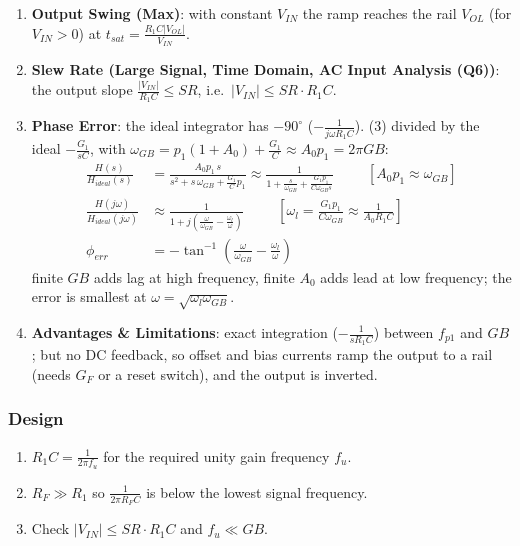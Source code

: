 \begin{enumerate}
    \paragraph{At Output:} as Section~\ref{sec:amp_inverting}, \(Z_{out} = \frac{R_o}{1 + A F(s)}\).
  \item \textbf{Output Swing (Max)}: with constant \(V_{IN}\) the ramp reaches the rail
    \(V_{OL}\) (for \(V_{IN} > 0\)) at \(t_{sat} = \frac{R_1 C |V_{OL}|}{V_{IN}}\).
  \item \textbf{Slew Rate (Large Signal, Time Domain, AC Input Analysis (Q6))}: the output
    slope \(\frac{|V_{IN}|}{R_1 C} \leq SR\), i.e.\ \(|V_{IN}| \leq SR \cdot R_1 C\).
  \item \textbf{Phase Error}: the ideal integrator has \(-90^\circ\) (\(-\frac{1}{j\omega R_1 C}\)). (3) divided by the
    ideal \(-\frac{G_1}{sC}\), with \(\omega_{GB} = p_1(1 + A_0) + \frac{G_1}{C} \approx A_0 p_1 = 2\pi GB\):
    \begin{align*}
      \frac{H(s)}{H_{ideal}(s)} &= \frac{A_0 p_1\, s}{s^2 + s\,\omega_{GB} + \frac{G_1}{C} p_1}
       \approx \frac{1}{1 + \frac{s}{\omega_{GB}} + \frac{G_1 p_1}{C\omega_{GB} s}} \hspace{1cm} [A_0 p_1 \approx \omega_{GB}] \\
      \frac{H(j\omega)}{H_{ideal}(j\omega)} &\approx \frac{1}{1 + j\left(\frac{\omega}{\omega_{GB}} - \frac{\omega_{l}}{\omega}\right)} \hspace{1cm} \left[\omega_l = \frac{G_1 p_1}{C\omega_{GB}} \approx \frac{1}{A_0 R_1 C}\right] \\
      \phi_{err} &= -\tan^{-1}\left(\frac{\omega}{\omega_{GB}} - \frac{\omega_l}{\omega}\right)
    \end{align*}
    finite \(GB\) adds lag at high frequency, finite \(A_0\) adds lead at low frequency; the error is
    smallest at \(\omega = \sqrt{\omega_l \omega_{GB}}\).
  \item \textbf{Advantages \& Limitations}: exact integration (\(-\frac{1}{s R_1 C}\)) between
    \(f_{p1}\) and \(GB\); but no DC feedback, so offset and bias currents ramp the output
    to a rail (needs \(G_F\) or a reset switch), and the output is inverted.
\end{enumerate}

\subsubsection{Design}
\begin{enumerate}
  \item \(R_1 C = \frac{1}{2\pi f_u}\) for the required unity gain frequency \(f_u\).
  \item \(R_F \gg R_1\) so \(\frac{1}{2\pi R_F C}\) is below the lowest signal frequency.
  \item Check \(|V_{IN}| \leq SR \cdot R_1 C\) and \(f_u \ll GB\).
\end{enumerate}

